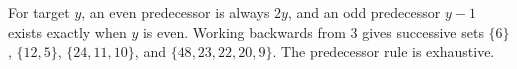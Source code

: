 For target $y$, an even predecessor is always $2y$, and an odd predecessor $y-1$ exists exactly when $y$ is even. Working backwards from 3 gives successive sets $\{6\}$, $\{12,5\}$, $\{24,11,10\}$, and $\boxed{\{48,23,22,20,9\}}$. The predecessor rule is exhaustive.
